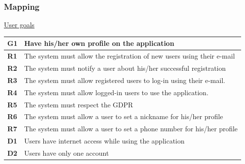\documentclass[../RASD.tex]{subfiles}
\begin{document}
    \subsubsection{Mapping}
    \underline{User goals}
        \begin{table}[ht]
            \begin{center}
                \begin{tabular}{|m{2em}|m{30em}|}
                \hline
                \rowcolor{ReqMappingRow1}
                \textbf{G1} & \textbf{Have his/her own profile on the application}\\
                \hline
                \cellcolor{ReqMappingCell2}
                \textbf{R1} & The system must allow the registration of new users using their e-mail\\
                \hline
                \cellcolor{ReqMappingCell2}
                \textbf{R2} & The system must notify a user about his/her successful registration\\
                \hline
                \cellcolor{ReqMappingCell2}
                \textbf{R3} & The system must allow registered users to log-in using their e-mail.\\
                \hline
                \cellcolor{ReqMappingCell2}
                \textbf{R4} & The system must allow logged-in users to use the application.\\
                \hline
                \cellcolor{ReqMappingCell2}
                \textbf{R5} & The system must respect the GDPR\\
                \hline
                \cellcolor{ReqMappingCell2}
                \textbf{R6} & The system must allow a user to set a nickname for his/her profile\\
                \hline
                \cellcolor{ReqMappingCell2}
                \textbf{R7} & The system must allow a user to set a phone number for his/her profile\\
                \hline
                \cellcolor{ReqMappingCell3}
                \textbf{D1} & Users have internet access while using the application\\
                \hline
                \cellcolor{ReqMappingCell3}
                \textbf{D2} & Users have only one account\\
                \hline
                \end{tabular}
            \end{center}
        \end{table}\newpage
\end{document}
